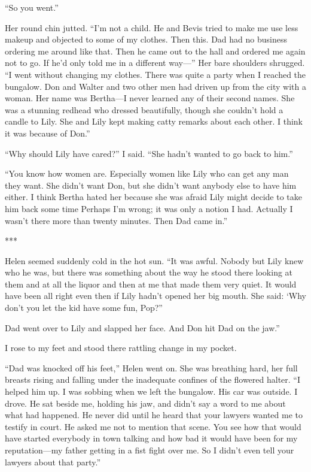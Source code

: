 {“So you went.”

Her round chin jutted. “I’m not a child. He and Bevis tried to make me use less makeup and objected to some of my clothes. Then this. Dad had no business ordering me around like that. Then he came out to the hall and ordered me again not to go. If he’d only told me in a different way—” Her bare shoulders shrugged. “I went without changing my clothes. There was quite a party when I reached the bungalow. Don and Walter and two other men had driven up from the city with a woman. Her name was Bertha—I never learned any of their second names. She was a stunning redhead who dressed beautifully, though she couldn’t hold a candle to Lily. She and Lily kept making catty remarks about each other. I think it was because of Don.”

“Why should Lily have cared?” I said. “She hadn’t wanted to go back to him.”

“You know how women are. Especially women like Lily who can get any man they want. She didn’t want Don, but she didn’t want anybody else to have him either. I think Bertha hated her because she was afraid Lily might decide to take him back some time Perhaps I’m wrong; it was only a notion I had. Actually I wasn’t there more than twenty minutes. Then Dad came in.”

***

Helen seemed suddenly cold in the hot sun. “It was awful. Nobody but Lily knew who he was, but there was something about the way he stood there looking at them and at all the liquor and then at me that made them very quiet. It would have been all right even then if Lily hadn’t opened her big mouth. She said: ‘Why don’t you let the kid have some fun, Pop?”

Dad went over to Lily and slapped her face. And Don hit Dad on the jaw.”

I rose to my feet and stood there rattling change in my pocket.

“Dad was knocked off his feet,” Helen went on. She was breathing hard, her full breasts rising and falling under the inadequate confines of the flowered halter. “I helped him up. I was sobbing when we left the bungalow. His car was outside. I drove. He sat beside me, holding his jaw, and didn’t say a word to me about what had happened. He never did until he heard that your lawyers wanted me to testify in court. He asked me not to mention that scene. You see how that would have started everybody in town talking and how bad it would have been for my reputation—my father getting in a fist fight over me. So I didn’t even tell your lawyers about that party.”

}
